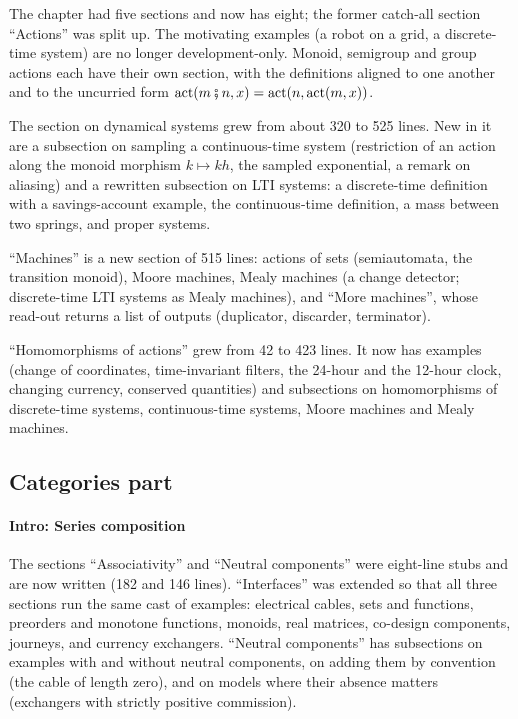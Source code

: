 \documentclass[11pt,a4paper]{article}
\begin{document}
The chapter had five sections and now has eight; the former catch-all section ``Actions'' was
split up. The motivating examples (a robot on a grid, a
discrete-time system) are no longer development-only. Monoid, semigroup and group actions each have
their own section, with the definitions aligned to one another and to the uncurried form
$\mathrm{act}(m \fatsemi n, x) = \mathrm{act}(n, \mathrm{act}(m, x))$.

The section on dynamical systems grew from about 320 to 525 lines. New in it are a subsection on
sampling a continuous-time system (restriction of an action along the monoid morphism
$k \mapsto kh$, the sampled exponential, a remark on aliasing) and a rewritten subsection on LTI
systems: a discrete-time definition with a savings-account example, the continuous-time
definition, a mass between two springs, and proper systems.

``Machines'' is a new section of 515 lines: actions of sets (semiautomata, the transition monoid),
Moore machines, Mealy machines (a change detector; discrete-time LTI systems as Mealy machines), and
``More machines'', whose read-out returns a list of outputs (duplicator, discarder, terminator).

``Homomorphisms of actions'' grew from 42 to 423 lines. It now has examples (change of coordinates,
time-invariant filters, the 24-hour and the 12-hour clock, changing currency, conserved quantities)
and subsections on homomorphisms of discrete-time systems, continuous-time systems, Moore machines
and Mealy machines.

\subsection{Categories part}

\paragraph{Intro: Series composition} The sections ``Associativity'' and ``Neutral components''
were eight-line stubs and are now written (182 and 146 lines). ``Interfaces'' was extended so that
all three sections run the same cast of examples: electrical cables, sets and functions, preorders
and monotone functions, monoids, real matrices, co-design components, journeys, and currency
exchangers. ``Neutral components'' has subsections on examples with and without neutral
components, on adding them by convention (the cable of length zero), and on models where their
absence matters (exchangers with strictly positive commission).
\end{document}
